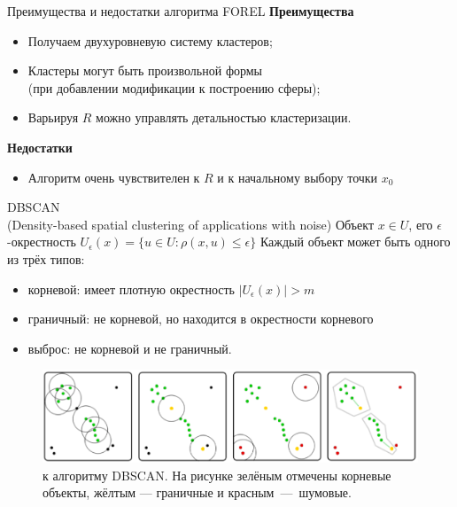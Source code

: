 \documentclass{beamer}
\begin{document}
\begin{frame}{Преимущества и недостатки алгоритма FOREL}
   \textbf{Преимущества}\\
   \begin{itemize}
       \item Получаем двухуровневую систему кластеров;
       \item Кластеры могут быть произвольной формы\\ (при добавлении модификации к построению сферы);
       \item Варьируя $R$ можно управлять детальностью кластеризации.
   \end{itemize}
   \vspace{4\ex}
   \textbf{Недостатки}\\
   \begin{itemize}
       \item Алгоритм очень чувствителен к $R$ и к начальному выбору точки $x_0$
   \end{itemize}
\end{frame}

\begin{frame}{DBSCAN\\ \footnotesize(Density-based spatial clustering of applications with noise)}
   Объект $x \in U$, его $\epsilon$-окрестность $U_{\epsilon}(x) = \{u \in U: \rho(x, u) \leq \epsilon\}$ Каждый объект может быть одного из трёх типов:
   \begin{itemize}
       \item корневой: имеет плотную окрестность $|U_{\epsilon}(x)| > m$
       \item граничный: не корневой, но находится в окрестности корневого
       \item выброс: не корневой и не граничный.
   \end{itemize}
   \begin{figure}
   \vspace{-2\ex}
   \begin{center}
   \includegraphics[scale = 0.4]{DBSCAN.png}
   \caption{ к алгоритму DBSCAN. На рисунке зелёным отмечены корневые объекты, жёлтым --- граничные и красным~---~шумовые.}
   \end{center}
   \end{figure}
\end{frame}
\end{document}
